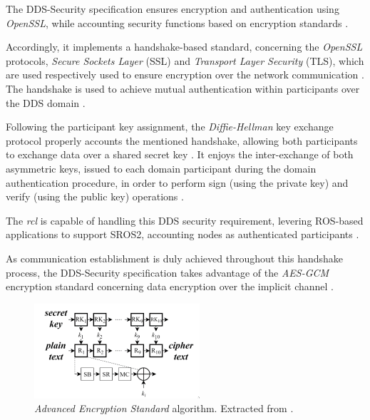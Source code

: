 
The DDS-Security specification ensures encryption and authentication using \textit{OpenSSL}, while accounting security functions based on encryption standards \cite{takemoto2019performance}. 

Accordingly, it implements a handshake-based standard, concerning the \textit{OpenSSL} protocols, \textit{Secure Sockets Layer} (SSL) and \textit{Transport Layer Security} (TLS), which are used respectively used to ensure encryption over the network communication \cite{white2016sros, kim2018security}. The handshake is used to achieve mutual authentication within participants over the DDS domain \cite{white2019network}.

Following the participant key assignment, the \textit{Diffie-Hellman} key exchange protocol properly accounts the mentioned handshake, allowing both participants to exchange data over a shared secret key \cite{kim2018security}. %
It enjoys the inter-exchange of both asymmetric keys, issued to each domain participant during the domain authentication procedure, in order to perform sign (using the private key) and verify (using the public key) operations \cite{kim2018security, diluoffo2018robot}.

The \textit{rcl} is capable of handling this DDS security requirement, levering ROS-based applications to support SROS2, accounting nodes as authenticated participants \cite{white2016sros}. 

As communication establishment is duly achieved throughout this handshake process, the DDS-Security specification takes advantage of the \textit{AES-GCM} encryption standard concerning data encryption over the implicit channel \cite{kim2018security, takemoto2019performance}.

\begin{figure}[H]
    \centering
    \includegraphics[width=0.4\linewidth]{images/ros_aes.png}
    \caption{\textit{Advanced Encryption Standard} algorithm. Extracted from \cite{takemoto2019performance}.}
    \label{fig:ros_aes}
\end{figure}

